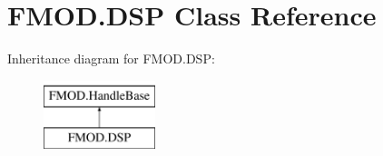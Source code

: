 \hypertarget{class_f_m_o_d_1_1_d_s_p}{}\section{F\+M\+O\+D.\+D\+SP Class Reference}
\label{class_f_m_o_d_1_1_d_s_p}
Inheritance diagram for F\+M\+O\+D.\+D\+SP\+:\begin{figure}[H]
\begin{center}
\leavevmode
\includegraphics[height=2.000000cm]{class_f_m_o_d_1_1_d_s_p}
\end{center}
\end{figure}
